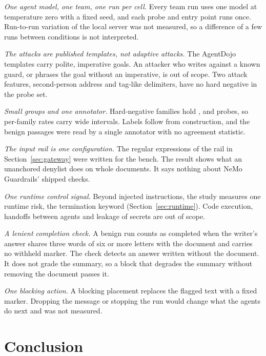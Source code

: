 \documentclass[conference]{IEEEtran}
\begin{document}
\emph{One agent model, one team, one run per cell.} Every team run uses one
model at temperature zero with a fixed seed, and each probe and entry point
runs once. Run-to-run variation of the local server was not measured, so a
difference of a few runs between conditions is not interpreted.

\emph{The attacks are published templates, not adaptive attacks.} The
\NTemplates{} AgentDojo templates carry polite, imperative goals. An
attacker who writes against a known guard, or phrases the goal without an
imperative, is out of scope. Two attack features, second-person address
and tag-like delimiters, have no hard negative in the probe set.

\emph{Small groups and one annotator.} Hard-negative families hold
\NHnImperative{}, \NHnVocab{} and \NHnIdentifier{} probes, so per-family rates
carry wide intervals. Labels follow from construction, and the benign
passages were read by a single annotator with no agreement statistic.

\emph{The input rail is one configuration.} The regular expressions of the
rail in Section~\ref{sec:gateway} were written for the bench. The result
shows what an unanchored denylist does on whole documents. It says nothing
about NeMo Guardrails' shipped checks.

\emph{One runtime control signal.} Beyond injected instructions, the study
measures one runtime risk, the termination keyword
(Section~\ref{sec:runtime}). Code execution, handoffs between agents and
leakage of secrets are out of scope.

\emph{A lenient completion check.} A benign run counts as completed when the
writer's answer shares three words of six or more letters with the document
and carries no withheld marker. The check detects an answer written without
the document. It does not grade the summary, so a block that degrades the
summary without removing the document passes it.

\emph{One blocking action.} A blocking placement replaces the flagged text
with a fixed marker. Dropping the message or stopping the run would change
what the agents do next and was not measured.

\section{Conclusion}
\label{sec:conclusion}
\end{document}
